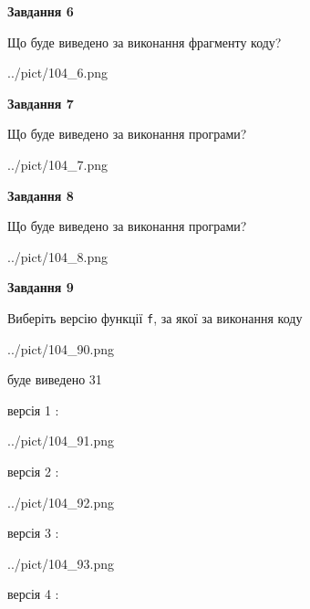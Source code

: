 \documentclass[12pt, ukrainian]{article}
\def\code#1{\Verb!#1!}
\begin{document}
{\begin {large}
{\begin {center}\textbf{Завдання 6}\end {center}}

Що буде виведено за виконання фрагменту коду?\par
\begin{center}
	{../pict/104_6.png}
\end{center}
\newpage

{\begin {center}\textbf{Завдання 7}\end {center}}

Що буде виведено за виконання програми?\par
\begin{center}
	{../pict/104_7.png}
\end{center}
\newpage

{\begin {center}\textbf{Завдання 8}\end {center}}

Що буде виведено за виконання програми?\par
\begin{center}
	{../pict/104_8.png}
\end{center}
\newpage

{\begin {center}\textbf{Завдання 9}\end {center}}

Виберіть версію функції \code{f}, за якої за виконання коду
\begin{center}
	{../pict/104_90.png}
\end{center}
буде виведено 31

\vspace{5mm}
версія 1 :

\begin{center}
	{../pict/104_91.png}
\end{center}
версія 2 :

\begin{center}
	{../pict/104_92.png}
\end{center}
версія 3 :

\begin{center}
	{../pict/104_93.png}
\end{center}
версія 4 :


\end{large}}
\end{document}
